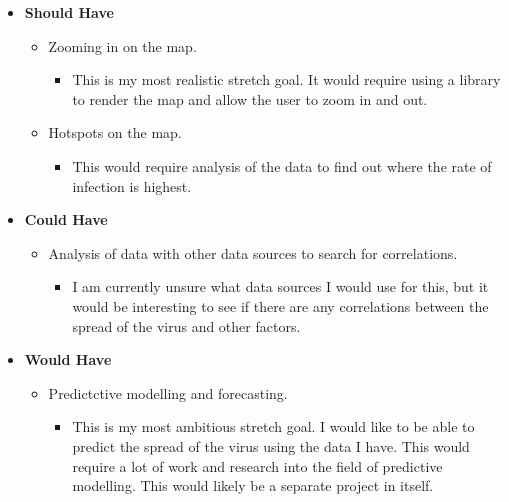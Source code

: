 \documentclass{report}
\begin{document}
\begin{itemize}
\begin{itemize}
    \end{itemize}
    \item \textbf{\Large{Should Have}}
    \begin{itemize}
        \item Zooming in on the map.
        \begin{itemize}
            \item This is my most realistic stretch goal. It would require using a library to render the map and allow the user to zoom in and out.
        \end{itemize}
        \item Hotspots on the map.
        \begin{itemize}
            \item This would require analysis of the data to find out where the rate of infection is highest.
        \end{itemize}
    \end{itemize}
    \item \textbf{\Large{Could Have}}
    \begin{itemize}
        \item Analysis of data with other data sources to search for correlations.
        \begin{itemize}
            \item I am currently unsure what data sources I would use for this, but it would be interesting to see if there are any correlations between the spread of the virus and other factors.
        \end{itemize}
    \end{itemize}
    \item \textbf{\Large{Would Have}}
    \begin{itemize}
        \item Predictctive modelling and forecasting.
        \begin{itemize}
            \item This is my most ambitious stretch goal. I would like to be able to predict the spread of the virus using the data I have. This would require a lot of work and research into the field of predictive modelling. This would likely be a separate project in itself.
        \end{itemize}
    \end{itemize}
\end{itemize}
\newpage
\end{document}
